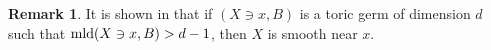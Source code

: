 \documentclass[11pt]{amsart}
\numberwithin{equation}{section}
\newcommand{\mld}{{\rm{mld}}}
\theoremstyle{definition}
\newtheorem{rem}[thm]{Remark}
\theoremstyle{definition}
\begin{document}
\begin{rem}
It is shown in \cite[Proposition~4.2]{Amb99} that if $(X\ni x,B)$ is a toric germ of dimension $d$ such that $\mld(X\ni x, B)>d-1$, then $X$ is smooth near $x$.
\end{rem}







\end{document}
